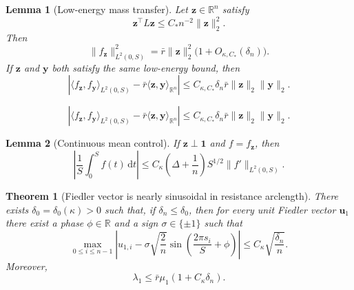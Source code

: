 \documentclass[10pt,a4paper]{amsart}
\newtheorem{lemma}{Lemma}
\newtheorem{theorem}{Theorem}
\begin{document}
\begin{lemma}[Low-energy mass transfer]\label{lem:low_energy_mass_transfer}
	Let $\boldsymbol{z}\in\mathbb{R}^n$ satisfy
	\[
	\boldsymbol{z}^\top L\boldsymbol{z}\le C_*n^{-2}\|\boldsymbol{z}\|_2^2.
	\]
	Then
	\begin{equation}\label{eq:low_energy_mass_transfer}
		\|f_{\boldsymbol{z}}\|_{L^2(0,S)}^2
		=
		\bar r\|\boldsymbol{z}\|_2^2\bigl(1+O_{\kappa,C_*}(\delta_n)\bigr).
	\end{equation}
	If $\boldsymbol{z}$ and $\boldsymbol{y}$ both satisfy the same
	low-energy bound, then
	\begin{equation}\label{eq:bilinear_mass_transfer}
		\left|
		\langle f_{\boldsymbol{z}},f_{\boldsymbol{y}}\rangle_{L^2(0,S)}
		-\bar r\langle\boldsymbol{z},\boldsymbol{y}\rangle_{\mathbb{R}^n}
		\right|
		\le
		C_{\kappa,C_*}\delta_n\bar r
		\|\boldsymbol{z}\|_2\|\boldsymbol{y}\|_2.
	\end{equation}
\end{lemma}

	\begin{equation}
		\left|
		\langle f_{\boldsymbol{z}},f_{\boldsymbol{y}}\rangle_{L^2(0,S)}
		-\bar r\langle\boldsymbol{z},\boldsymbol{y}\rangle_{\mathbb{R}^n}
		\right|
		\le
		C_{\kappa,C_*}\delta_n\bar r
		\|\boldsymbol{z}\|_2\|\boldsymbol{y}\|_2.
	\end{equation}

\begin{lemma}[Continuous mean control]\label{lem:continuous_mean_control}
	If $\boldsymbol{z}\perp\boldsymbol{1}$ and $f=f_{\boldsymbol{z}}$, then
	\begin{equation}\label{eq:continuous_mean_control}
		\left|\frac1S\int_0^Sf(t)\,\mathrm dt\right|
		\le
		C_\kappa\left(\Delta+\frac1n\right)S^{1/2}\|f'\|_{L^2(0,S)}.
	\end{equation}
\end{lemma}

\begin{theorem}[Fiedler vector is nearly sinusoidal in resistance arclength]\label{thm:fiedler-sine}
	There exists $\delta_0=\delta_0(\kappa)>0$ such that, if
	$\delta_n\le \delta_0$, then for every unit Fiedler vector
	$\boldsymbol{u}_1$ there exist a phase $\phi\in\mathbb{R}$ and a sign
	$\sigma\in\{\pm 1\}$ such that
	\begin{equation}\label{eq:fiedler_sine_sup}
		\max_{0\le i\le n-1}
		\left|
		u_{1,i}-\sigma\sqrt{\frac2n}
		\sin\left(\frac{2\pi s_i}{S}+\phi\right)
		\right|
		\le
		C_\kappa\sqrt{\frac{\delta_n}{n}}.
	\end{equation}
	Moreover,
	\begin{equation}\label{eq:lambda1_upper_for_later}
		\lambda_1\le \bar r\mu_1(1+C_\kappa\delta_n).
	\end{equation}
\end{theorem}
\end{document}
